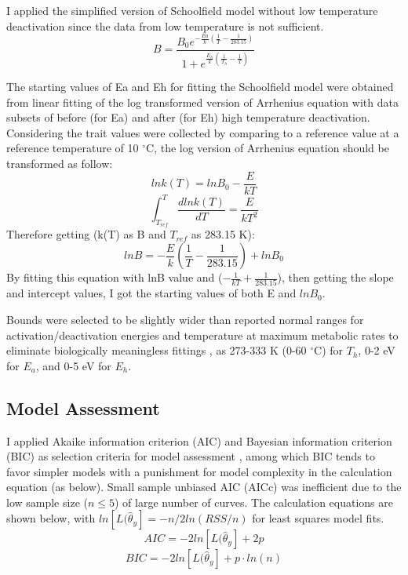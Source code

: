 \documentclass[11pt, a4paper]{article}
\begin{document}
\begin{spacing}{1.5}
I applied the simplified version of Schoolfield model without low temperature deactivation since the data from low temperature is not sufficient. 
\begin{equation}
    B = \frac{B_0e^{-\frac{Ea}{k}(\frac{1}{T} - \frac{1}{283.15})}}{1+e^{\frac{E_h}{k}(\frac{1}{T_h} - \frac{1}{T})}}
\end{equation}

The starting values of Ea and Eh for fitting the Schoolfield model were obtained from linear fitting of the log transformed version of Arrhenius equation with data subsets of before (for Ea) and after (for Eh) high temperature deactivation. Considering the trait values were collected by comparing to a reference value at a reference temperature of 10 $^{\circ}$C, the log version of Arrhenius equation should be transformed as follow: 
\begin{equation}
    lnk(T)= ln{B_0}-\frac{E}{kT}
\end{equation}
\begin{equation}
    \int_{T_{ref}}^T \frac{dlnk(T)}{dT}=\frac{E}{kT^2}
\end{equation}
Therefore getting (k(T) as B and $T_{ref}$ as 283.15 K):
\begin{equation}
    lnB = -\frac{E}{k}(\frac{1}{T}-\frac{1}{283.15})+lnB_0
\end{equation}
By fitting this equation with lnB value and ($-\frac{1}{kT}+\frac{1}{283.15}$), then getting the slope and intercept values, I got the starting values of both E and $lnB_{0}$. 

Bounds were selected to be slightly wider than reported normal ranges for activation/deactivation energies and temperature at maximum metabolic rates to eliminate biologically meaningless fittings \citep{gillooly2001effects, zwietering1991modeling, doran1995homogeneous}, as 273-333 K (0-60 $^{\circ}$C) for $T_h$, 0-2 eV for $E_a$, and 0-5 eV for $E_h$. 

\subsection{Model Assessment}
I applied Akaike information criterion (AIC) and Bayesian information criterion (BIC) as selection criteria for model assessment \citep{johnson2004model}, among which BIC tends to favor simpler models with a punishment for model complexity in the calculation equation (as below). Small sample unbiased AIC (AICc) was inefficient due to the low sample size ($n \le 5$) of large number of curves. The calculation equations are shown below, with $ln[L(\hat{\theta}_y]=-n/2ln(RSS/n)$ for least squares model fits. 
\begin{equation}
    AIC = -2ln[L(\hat{\theta}_y]+2p
\end{equation}
\begin{equation}
    BIC = -2ln[L(\hat{\theta}_y]+p\cdot ln(n)
\end{equation}


\end{spacing}
\end{document}
